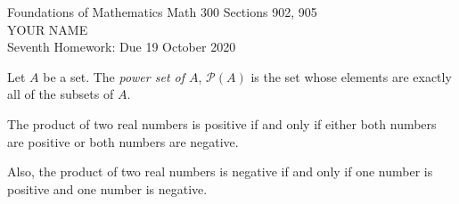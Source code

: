 \documentclass[12pt]{article}
\newcommand{\defn}[1]{{\color{blue}\sl #1}}
\newcommand{\deco}[1]{{\color{blue} #1}}
\newcommand{\calP}{{\mathcal P}}
\begin{document}
\LARGE 
\noindent
{\color{Maroon}Foundations of Mathematics \hfill Math 300 Sections 902, 905}\vspace{2pt}\\
\Large YOUR NAME\vspace{2pt}\\
\large
Seventh Homework: \hfill Due 19 October 2020
\normalsize    %

\noindent{\color{blue}\rule{529pt}{2pt}}


  Let $A$ be a set.  The \defn{power set of $A$}, \deco{$\calP(A)$} is the set whose elements are
exactly all of the subsets of $A$.

 The product of two real numbers is positive if and only if either both numbers are positive or both
numbers are negative.

Also,  the product of two real numbers is negative if and only if one number is positive and one number is negative.
\end{document}
